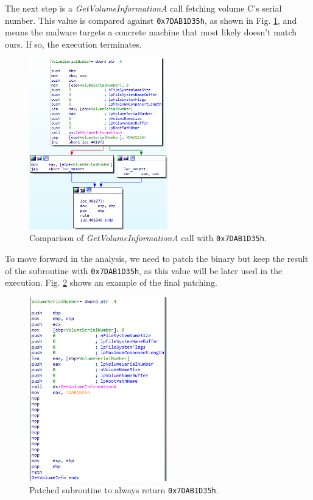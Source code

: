 The next step is a \textit{GetVolumeInformationA} call fetching volume C's serial number. This value is compared against \texttt{0x7DAB1D35h}, as shown in Fig. \ref{fig:ida_3}, and means the malware targets a concrete machine that most likely doesn't match ours. If so, the execution terminates.

\begin{figure}[H]
    \includegraphics[width=6cm]{figures/ida_3.png}
    \caption{Comparison of \textit{GetVolumeInformationA} call with \texttt{0x7DAB1D35h}.}
    \label{fig:ida_3}
\end{figure}

To move forward in the analysis, we need to patch the binary but keep the result of the subroutine with \texttt{0x7DAB1D35h}, as this value will be later used in the execution. Fig. \ref{fig:ida_4} shows an example of the final patching.

\begin{figure}[H]
    \includegraphics[width=6cm]{figures/ida_4.png}
    \caption{Patched subroutine to always return \texttt{0x7DAB1D35h}.}
    \label{fig:ida_4}
\end{figure}

